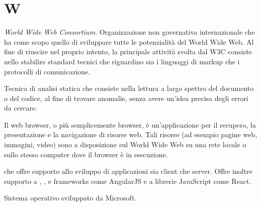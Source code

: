 

\section{W}

\textit{World Wide Web Consortium}. Organizzazione non governativa internazionale che ha come scopo quello di sviluppare tutte le potenzialità del World Wide Web. Al fine di riuscire nel proprio intento, la principale attività svolta dal W3C consiste nello stabilire standard tecnici che riguardino sia i linguaggi di markup che i protocolli di comunicazione.


Tecnica di analisi statica che consiste nella lettura a largo spettro del documento o del codice, al fine di trovare anomalie, senza avere un'idea precisa degli errori da cercare.


Il web browser, o più semplicemente browser, è un'applicazione per il recupero, la presentazione e la navigazione di risorse web. Tali risorse (ad esempio pagine web, immagini, video) sono a disposizione sul World Wide Web su una rete locale o sullo stesso computer dove il browser è in esecuzione. 

 che offre supporto allo sviluppo di applicazioni  sia client che server. Offre inoltre supporto a , ,  e frameworks come AngularJS e a librerie JavaScript come React.



Sistema operativo sviluppato da Microsoft.

